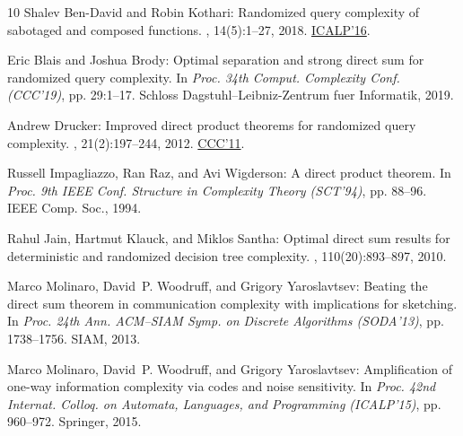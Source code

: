 \documentclass[11pt]{article}
\numberwithin{equation}{section}
\theoremstyle{definition}
\theoremstyle{plain}
\begin{document}
\begin{thebibliography}{10}
{\sc Shalev Ben{-}David and Robin Kothari}: Randomized query complexity of
  sabotaged and composed functions.
, 14(5):1--27, 2018.
\newblock \prelim
  \href{https://doi.org/10.4230/LIPIcs.ICALP.2016.60}{ICALP'16}.

{\sc Eric Blais and Joshua Brody}: Optimal separation and strong direct sum for
  randomized query complexity.
\newblock In {\em Proc. 34th Comput. Complexity Conf. (CCC'19)}, pp. 29:1--17.
  Schloss Dagstuhl--Leibniz-Zentrum fuer Informatik, 2019.

{\sc Andrew Drucker}: Improved direct product theorems for randomized query
  complexity.
, 21(2):197--244, 2012.
\newblock \prelim \href{https://doi.org/10.1109/CCC.2011.29}{CCC'11}.

{\sc Russell Impagliazzo, Ran Raz, and Avi Wigderson}: A direct product
  theorem.
\newblock In {\em Proc. 9th IEEE Conf. Structure in Complexity Theory
  (SCT'94)}, pp. 88--96. IEEE Comp. Soc., 1994.

{\sc Rahul Jain, Hartmut Klauck, and Miklos Santha}: Optimal direct sum results
  for deterministic and randomized decision tree complexity.
, 110(20):893--897, 2010.

{\sc Marco Molinaro, David~P. Woodruff, and Grigory Yaroslavtsev}: Beating the
  direct sum theorem in communication complexity with implications for
  sketching.
\newblock In {\em Proc. 24th Ann. ACM--SIAM Symp. on Discrete Algorithms
  (SODA'13)}, pp. 1738--1756. SIAM, 2013.
\newblock [\epfmtdoi{10.1137/1.9781611973105.125}]

{\sc Marco Molinaro, David~P. Woodruff, and Grigory Yaroslavtsev}:
  Amplification of one-way information complexity via codes and noise
  sensitivity.
\newblock In {\em Proc. 42nd Internat. Colloq. on Automata, Languages, and
  Programming (ICALP'15)}, pp. 960--972. Springer, 2015.


\end{thebibliography}
\end{document}
